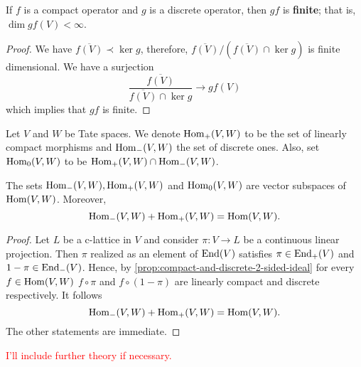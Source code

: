 \begin{remark}\label{rem:discrete-composition-compact}
If $f$ is a compact operator and $g$ is a discrete operator, then $gf$ is \textbf{finite}; that is, $\dim gf(V) < \infty$.  
\end{remark}
\begin{proof}
	We have $\overline{f(V)} \prec \ker g$, therefore, $\overline{f(V)}/(\overline{f(V)} \cap \ker g)$ is finite dimensional. We have a surjection
	\[
		\frac{\overline{f(V)}}{\overline{f(V)}\cap \ker g} \to gf(V)
	\]
	which implies that $gf$ is finite.
\end{proof}
\begin{definition}\label{def:2-sided-ideals-in-hom}
	Let $V$ and $W$ be Tate spaces. \linebreak We denote $\operatorname{Hom}_{+}(V,W)$ to be the set of linearly compact morphisms and $\operatorname{Hom}_{-}(V,W)$ the set of discrete ones. Also, set $\operatorname{Hom}_{0}(V,W)$ to be $\operatorname{Hom}_{+}(V,W) \cap \operatorname{Hom}_{-}(V,W)$.
\end{definition}
\begin{proposition}\label{prop:discrete-compact-operators-present-the-whole-space}
	The sets $\operatorname{Hom}_{-}(V,W), \operatorname{Hom}_{+}(V,W)$ and \linebreak $\operatorname{Hom}_{0}(V,W)$ are vector subspaces of $\operatorname{Hom}(V,W)$. Moreover,
	\[
		\operatorname{Hom}_{-}(V,W) + \operatorname{Hom}_{+}(V,W) = \operatorname{Hom}(V,W).
	\]
\end{proposition}
\begin{proof}
	Let $L$ be a c-lattice in $V$ and consider $\pi\colon V \to L$ be a continuous linear projection. Then $\pi$ realized as an element of $\operatorname{End}(V)$ satisfies $\pi \in\operatorname{End}_{+}(V)$ and $1 -\pi\in\operatorname{End}_{-}(V)$. Hence, by \cref{prop:compact-and-discrete-2-sided-ideal} for every $f\in \operatorname{Hom}(V,W)$ $f\circ \pi$ and $f\circ (1 - \pi)$ are linearly compact and discrete respectively. It follows
	\[
		\operatorname{Hom}_{-}(V,W) + \operatorname{Hom}_{+}(V,W) = \operatorname{Hom}(V,W).
	\]
	The other statements are immediate.
\end{proof}
\textcolor{red}{I'll include further theory if necessary.}
